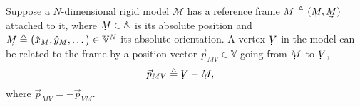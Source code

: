 Suppose a $N$-dimensional rigid model $\mathcal{M}$ has a reference frame $\ubar{M} \triangleq (\udot{M},\uvec{M})$ attached to it, where $\udot{M}\in\mathbb{A}$ is its absolute position and $\uvec{M}\triangleq\big(\hat{x}_{M},\hat{y}_{M},\dots\big)\in\mathbb{V}^N$ its absolute orientation.
%
%
%
%
%
A vertex $\udot{V}$ in the model can be related to the frame by a position vector $\vec{p}_{MV}\in\mathbb{V}$ going from $\udot{M}$ to $\udot{V}$,
%
\begin{align}
\vec{p}_{MV} &\triangleq \udot{V} - \udot{M},\label{eq_position_vector}
\end{align}
%
where $\vec{p}_{MV} = -\vec{p}_{V\!M}$. %
%
%
%
%
%
%
%
%
%
%
%

